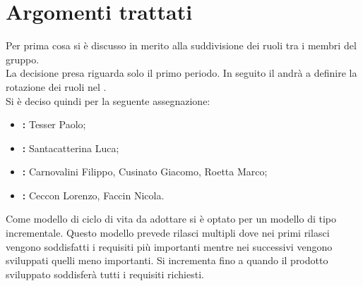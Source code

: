 %

\section{Argomenti trattati}
	Per prima cosa si è discusso in merito alla suddivisione dei ruoli tra i membri del gruppo.\\
	La decisione presa riguarda solo il primo periodo. In seguito il \roleProjectManager{} andrà a definire la rotazione dei ruoli nel \docNameVersionPdP.\\
	Si è deciso quindi per la seguente assegnazione:
		\begin{itemize}
			\item \textbf{\roleProjectManager :} \textnormal{Tesser Paolo;}
			\item \textbf{\roleAdministrator :} \textnormal{Santacatterina Luca;}
			\item \textbf{\roleAnalyst :} \textnormal{Carnovalini Filippo, Cusinato Giacomo, Roetta Marco;}
			\item \textbf{\roleVerifier :} \textnormal{Ceccon Lorenzo, Faccin Nicola.}
		\end{itemize}
	Come modello di ciclo di vita da adottare si è optato per un modello di tipo incrementale. Questo modello prevede rilasci multipli dove nei primi rilasci vengono soddisfatti i requisiti più importanti mentre nei successivi vengono sviluppati quelli meno importanti. Si incrementa fino a quando il prodotto sviluppato soddisferà tutti i requisiti richiesti.
